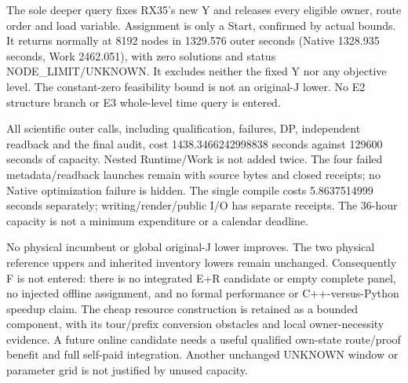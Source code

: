 The sole deeper query fixes RX35's new Y and releases every eligible owner,
route order and load variable. Assignment is only a Start, confirmed by
actual bounds. It returns normally at 8192 nodes in 1329.576 outer seconds
(Native 1328.935 seconds, Work 2462.051), with zero solutions and status
NODE\_LIMIT/UNKNOWN. It excludes neither the fixed Y nor any objective
level. The constant-zero feasibility bound is not an original-J lower.
No E2 structure branch or E3 whole-level time query is entered.

All scientific outer calls, including qualification, failures, DP,
independent readback and the final audit, cost 1438.3466242998838 seconds
against 129600 seconds of capacity. Nested Runtime/Work is not added twice.
The four failed metadata/readback launches remain with source bytes and
closed receipts; no Native optimization failure is hidden. The single
compile costs 5.8637514999 seconds separately; writing/render/public I/O
has separate receipts. The 36-hour capacity is not a minimum expenditure
or a calendar deadline.

No physical incumbent or global original-J lower improves. The two
physical reference uppers and inherited inventory lowers remain unchanged.
Consequently F is not entered: there is no integrated E+R candidate or
empty complete panel, no injected offline assignment, and no formal
performance or C++-versus-Python speedup claim. The cheap resource
construction is retained as a bounded component, with its tour/prefix
conversion obstacles and local owner-necessity evidence. A future online
candidate needs a useful qualified own-state route/proof benefit and full
self-paid integration. Another unchanged UNKNOWN window or parameter grid
is not justified by unused capacity.
